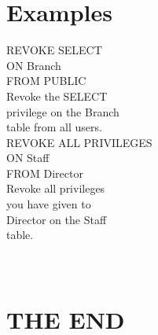 \documentclass[12pt]{article}
\begin{document}
\section{Examples}
REVOKE SELECT\\
ON Branch\\
FROM PUBLIC\\
Revoke the SELECT \\
privilege on the Branch \\
table from all users.\\
REVOKE ALL PRIVILEGES\\
ON Staff\\
FROM Director\\
Revoke all privileges \\
you have given to \\
Director on the Staff \\
table.\\
\\ 
 \\
\section{THE END}
\newpage
\\ 
\end{document}
